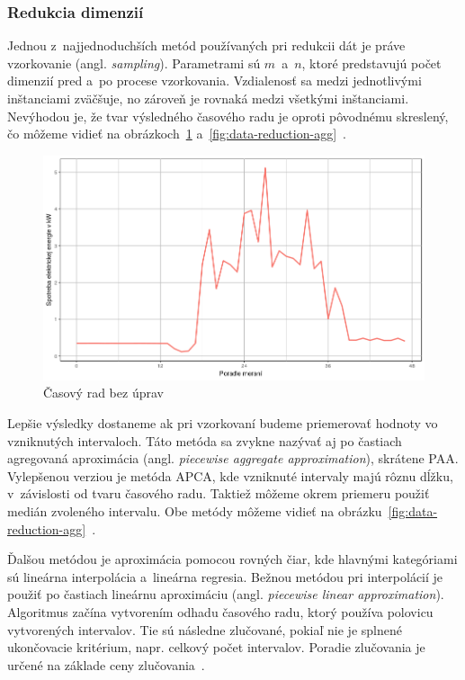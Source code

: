 \documentclass[a4paper,twoside,slovak,12pt,appendix]{article}
\begin{document}
\subsubsection{Redukcia dimenzií}
\label{c:dimension-reduction}
Jednou z~najjednoduchších metód používaných pri redukcii dát je práve
vzorkovanie (angl. \textit{sampling}). Parametrami sú $m$~a~$n$, ktoré
predstavujú počet dimenzií pred a~po procese vzorkovania. Vzdialenosť sa medzi
jednotlivými inštanciami zväčšuje, no zároveň je rovnaká medzi všetkými
inštanciami. Nevýhodou je, že tvar výsledného časového radu je oproti pôvodnému
skreslený, čo môžeme vidieť na obrázkoch~\ref{fig:data-reduction-orig}
a~\ref{fig:data-reduction-agg}~\cite{Fu2011}.

\begin{figure}[htbp]
  \centering
  \includegraphics[width=\textwidth]{data_reduction_orig.png}
  \caption{Časový rad bez úprav}
  \label{fig:data-reduction-orig}
\end{figure}

Lepšie výsledky dostaneme ak pri vzorkovaní budeme priemerovať hodnoty vo
vzniknutých intervaloch. Táto metóda sa zvykne nazývať aj po častiach agregovaná
aproximácia (angl. \textit{piecewise aggregate approximation}), skrátene PAA.
Vylepšenou verziou je metóda APCA, kde vzniknuté intervaly majú rôznu dĺžku,
v~závislosti od tvaru časového radu. Taktiež môžeme okrem priemeru použiť medián
zvoleného intervalu. Obe metódy môžeme vidieť na
obrázku~\ref{fig:data-reduction-agg}~\cite{Keogh2002}.

Ďalšou metódou je aproximácia pomocou rovných čiar, kde hlavnými kategóriami sú
lineárna interpolácia a~lineárna regresia. Bežnou metódou pri interpolácií je
použiť po častiach lineárnu aproximáciu (angl. \textit{piecewise linear
approximation}). Algoritmus začína vytvorením odhadu časového radu, ktorý
používa polovicu vytvorených intervalov. Tie sú následne zlučované, pokiaľ nie
je splnené ukončovacie kritérium, napr. celkový počet intervalov. Poradie
zlučovania je určené na základe ceny zlučovania~\cite{Fu2011}.
\end{document}
